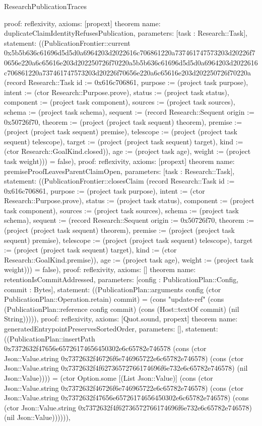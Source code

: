 \begin{lexlean}{ResearchPublicationTraces}
\begin{semanticmodule}
{ proof: reflexivity{},
 axioms: [propext]
}
theorem{
 name: duplicateClaimIdentityRefusesPublication,
 parameters: [task : Research::Task],
 statement: ((PublicationFrontier::current 0x5b5b636c61696d5d5d0a6964203d2022616c706861220a737461747573203d20226f70656e220a6c65616e203d202250726f70220a5b5b636c61696d5d5d0a6964203d2022616c706861220a737461747573203d20226f70656e220a6c65616e203d202250726f70220a (record Research::Task {id := 0x616c706861, purpose := (project task purpose), intent := (ctor Research::Purpose.prove), status := (project task status), component := (project task component), sources := (project task sources), schema := (project task schema), sequent := (record Research::Sequent {origin := 0x50726f70, theorem := (project (project task sequent) theorem), premise := (project (project task sequent) premise), telescope := (project (project task sequent) telescope), target := (project (project task sequent) target), kind := (ctor Research::GoalKind.closed)}), age := (project task age), weight := (project task weight)})) = false),
 proof: reflexivity{},
 axioms: [propext]
}
theorem{
 name: premiseProofLeavesParentClaimOpen,
 parameters: [task : Research::Task],
 statement: ((PublicationFrontier::closesClaim (record Research::Task {id := 0x616c706861, purpose := (project task purpose), intent := (ctor Research::Purpose.prove), status := (project task status), component := (project task component), sources := (project task sources), schema := (project task schema), sequent := (record Research::Sequent {origin := 0x50726f70, theorem := (project (project task sequent) theorem), premise := (project (project task sequent) premise), telescope := (project (project task sequent) telescope), target := (project (project task sequent) target), kind := (ctor Research::GoalKind.premise)}), age := (project task age), weight := (project task weight)})) = false),
 proof: reflexivity{},
 axioms: []
}
theorem{
 name: retentionIsCommitAddressed,
 parameters: [config : PublicationPlan::Config, commit : Bytes],
 statement: ((PublicationPlan::arguments config (ctor PublicationPlan::Operation.retain) commit) = (cons "update-ref" (cons (PublicationPlan::reference config commit) (cons (Host::textOf commit) (nil String))))),
 proof: reflexivity{},
 axioms: [Quot.sound, propext]
}
theorem{
 name: generatedEntrypointPreservesSortedOrder,
 parameters: [],
 statement: ((PublicationPlan::insertPath 0x7372632f47656e65726174656450302e6c65782e746578 (cons (ctor Json::Value.string 0x7372632f46726f6e746965722e6c65782e746578) (cons (ctor Json::Value.string 0x7372632f4f62736572766174696f6e732e6c65782e746578) (nil Json::Value)))) = (ctor Option.some [(List Json::Value)] (cons (ctor Json::Value.string 0x7372632f46726f6e746965722e6c65782e746578) (cons (ctor Json::Value.string 0x7372632f47656e65726174656450302e6c65782e746578) (cons (ctor Json::Value.string 0x7372632f4f62736572766174696f6e732e6c65782e746578) (nil Json::Value)))))),
}
\end{semanticmodule}
\end{lexlean}
